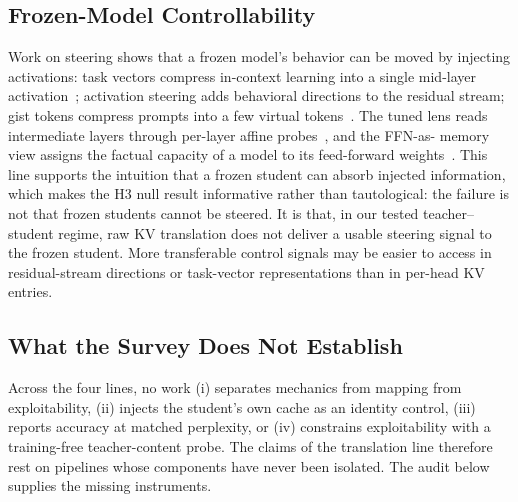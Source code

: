 \documentclass[10pt]{article}
\begin{document}
\subsection{Frozen-Model Controllability}
Work on steering shows that a frozen model's behavior can be moved by
injecting activations: task vectors compress in-context learning into a
single mid-layer activation~\citep{taskvectors2023}; activation steering adds
behavioral directions to the residual stream; gist tokens compress prompts
into a few virtual tokens~\citep{gist2023}. The tuned lens reads intermediate
layers through per-layer affine probes~\citep{tunedlens2023}, and the FFN-as-
memory view assigns the factual capacity of a model to its feed-forward
weights~\citep{ffnmemory2021}. This line supports the intuition that a frozen
student can absorb injected information, which makes the H3 null result
informative rather than tautological: the failure is not that frozen students
cannot be steered. It is that, in our tested teacher--student regime, raw KV
translation does not deliver a usable steering signal to the frozen student.
More transferable control signals may be easier to access in residual-stream
directions or task-vector representations than in per-head KV entries.

\subsection{What the Survey Does Not Establish}
Across the four lines, no work (i) separates mechanics from mapping from
exploitability, (ii) injects the student's own cache as an identity control,
(iii) reports accuracy at matched perplexity, or (iv) constrains exploitability
with a training-free teacher-content probe. The claims of the translation line
therefore rest on pipelines whose components have never been isolated. The
audit below supplies the missing instruments.
\end{document}
